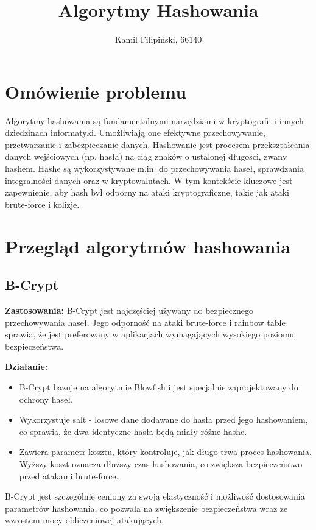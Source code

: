 \documentclass{article}
\title{Algorytmy Hashowania}
\author{Kamil Filipiński, 66140}
\date{}
\begin{document}
\maketitle

\section{Omówienie problemu}
Algorytmy hashowania są fundamentalnymi narzędziami w kryptografii i innych dziedzinach informatyki. Umożliwiają one efektywne przechowywanie, przetwarzanie i zabezpieczanie danych. Hashowanie jest procesem przekształcania danych wejściowych (np. hasła) na ciąg znaków o ustalonej długości, zwany hashem. Hashe są wykorzystywane m.in. do przechowywania haseł, sprawdzania integralności danych oraz w kryptowalutach. W tym kontekście kluczowe jest zapewnienie, aby hash był odporny na ataki kryptograficzne, takie jak ataki brute-force i kolizje.

\section{Przegląd algorytmów hashowania}

\subsection{B-Crypt}
\textbf{Zastosowania:} B-Crypt jest najczęściej używany do bezpiecznego przechowywania haseł. Jego odporność na ataki brute-force i rainbow table sprawia, że jest preferowany w aplikacjach wymagających wysokiego poziomu bezpieczeństwa.

\textbf{Działanie:}
\begin{itemize}
    \item B-Crypt bazuje na algorytmie Blowfish i jest specjalnie zaprojektowany do ochrony haseł.
    \item Wykorzystuje salt - losowe dane dodawane do hasła przed jego hashowaniem, co sprawia, że dwa identyczne hasła będą miały różne hashe.
    \item Zawiera parametr kosztu, który kontroluje, jak długo trwa proces hashowania. Wyższy koszt oznacza dłuższy czas hashowania, co zwiększa bezpieczeństwo przed atakami brute-force.
\end{itemize}

B-Crypt jest szczególnie ceniony za swoją elastyczność i możliwość dostosowania parametrów hashowania, co pozwala na zwiększenie bezpieczeństwa wraz ze wzrostem mocy obliczeniowej atakujących.
\end{document}
